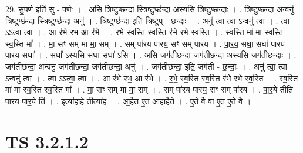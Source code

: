 \documentclass[17pt]{extarticle}
\begin{document}
29. सु॒प॒र्ण इति॑ सु - प॒र्णः । . अ॒सि॒ त्रि॒ष्टुप्छ॑न्दा स्त्रि॒ष्टुप्छ॑न्दा अस्यसि त्रि॒ष्टुप्छ॑न्दाः । . त्रि॒ष्टुप्छ॑न्दा॒ अन्वनु॑ त्रि॒ष्टुप्छ॑न्दा स्त्रि॒ष्टुप्छ॑न्दा॒ अनु॑ । . त्रि॒ष्टुप्छ॑न्दा॒ इति॑ त्रि॒ष्टुप् - छ॒न्दाः॒ । . अनु॑ त्वा॒ त्वा ऽन्वनु॑ त्वा । . त्वा ऽऽत्वा॒ त्वा । . आ र॑भे रभ॒ आ र॑भे । . र॒भे॒ स्व॒स्ति स्व॒स्ति र॑भे रभे स्व॒स्ति । . स्व॒स्ति मा॑ मा स्व॒स्ति स्व॒स्ति मा᳚ । . मा॒ सꣳ सम् मा॑ मा॒ सम् । . सम् पा॑रय पारय॒ सꣳ सम् पा॑रय । . पा॒र॒य॒ सघा॒ सघा॑ पारय पारय॒ सघा᳚ । . सघा᳚ ऽस्यसि॒ सघा॒ सघा॑ ऽसि । . अ॒सि॒ जग॑तीछन्दा॒ जग॑तीछन्दा अस्यसि॒ जग॑तीछन्दाः । . जग॑तीछन्दा॒ अन्वनु॒ जग॑तीछन्दा॒ जग॑तीछन्दा॒ अनु॑ । . जग॑तीछन्दा॒ इति॒ जग॑ती - छ॒न्दाः॒ । . अनु॑ त्वा॒ त्वा ऽन्वनु॑ त्वा । . त्वा ऽऽत्वा॒ त्वा । . आ र॑भे रभ॒ आ र॑भे । . र॒भे॒ स्व॒स्ति स्व॒स्ति र॑भे रभे स्व॒स्ति । . स्व॒स्ति मा॑ मा स्व॒स्ति स्व॒स्ति मा᳚ । . मा॒ सꣳ सम् मा॑ मा॒ सम् । . सम् पा॑रय पारय॒ सꣳ सम् पा॑रय । . पा॒र॒ये तीति॑ पारय पार॒ये ति॑ । . इत्या॑हा॒हे तीत्या॑ह । . आ॒है॒त ए॒त आ॑हाहै॒ते । . ए॒ते वै वा ए॒त ए॒ते वै । \newline


\section{ TS 3.2.1.2 }
\end{document}
